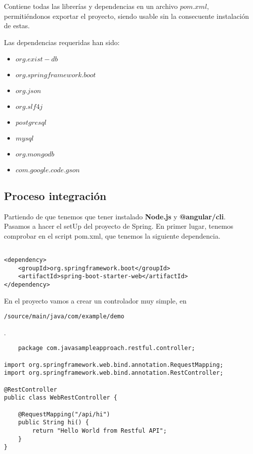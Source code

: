 \documentclass[12pt,a4paper]{article}
\begin{document}
	Contiene todas las librerías y dependencias en un archivo $pom.xml$, permitiéndonos exportar el proyecto, siendo usable sin la consecuente instalación de estas.
	
	Las dependencias requeridas han sido:
	
	\begin{itemize}

	\item $org.exist-db$
	\item $org.springframework.boot$
	\item $org.json$
	\item $org.slf4j$
	\item $postgresql$
	\item $mysql$
	\item $org.mongodb$
	\item $com.google.code.gson$
	\end{itemize}
	
\subsection{Proceso integración} \label{pto82}

Partiendo de que tenemos que tener instalado \textbf{Node.js} y \textbf{@angular/cli}. Pasamos a hacer el setUp del proyecto de Spring. En primer lugar, tenemos comprobar en el script pom.xml, que tenemos la siguiente dependencia.

\begin{verbatim}

<dependency>
	<groupId>org.springframework.boot</groupId>
	<artifactId>spring-boot-starter-web</artifactId>
</dependency>

\end{verbatim}


En el proyecto vamos a crear un controlador muy simple, en \begin{verbatim}/source/main/java/com/example/demo\end{verbatim}.

\begin{verbatim}
    package com.javasampleapproach.restful.controller;
 
import org.springframework.web.bind.annotation.RequestMapping;
import org.springframework.web.bind.annotation.RestController;
 
@RestController
public class WebRestController {
 
	@RequestMapping("/api/hi")
	public String hi() {
		return "Hello World from Restful API";
	}
}
\end{verbatim}
\end{document}
